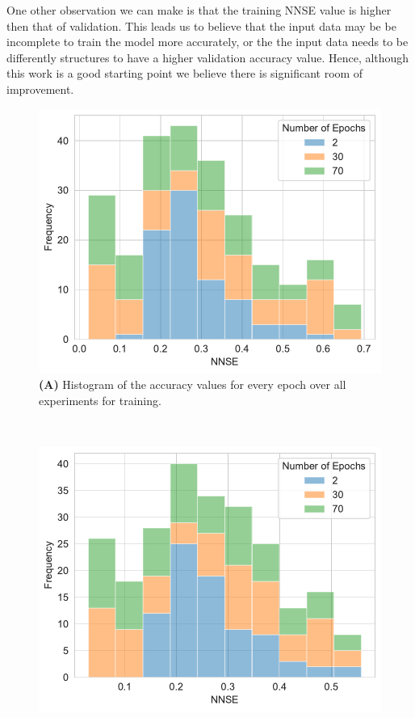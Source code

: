 \documentclass[utf8]{FrontiersinVancouver} %
\begin{document}
One other observation we can make is that the training NNSE value is higher then that of validation. This leads us to believe that the input data may be be incomplete to train the model more accurately, or the the input data needs to be differently structures to have a higher validation accuracy value. 
Hence, although this work is a good starting point we believe there is significant room of improvement.

\begin{figure}[p]

  \begin{center}
       \begin{minipage}[t]{0.49\textwidth}
        \includegraphics[width=1.0\linewidth]{images/frequency_nnse_histogram_stacked_training}
        {\bf (A)} Histogram of the accuracy values for every epoch over all experiments for training.
     \end{minipage}
  \ \
     \begin{minipage}[t]{0.49\textwidth}
        \includegraphics[width=1.0\linewidth]{images/frequency_nnse_histogram_stacked_validation}

\end{minipage}
\end{center}
\end{figure}
\end{document}
